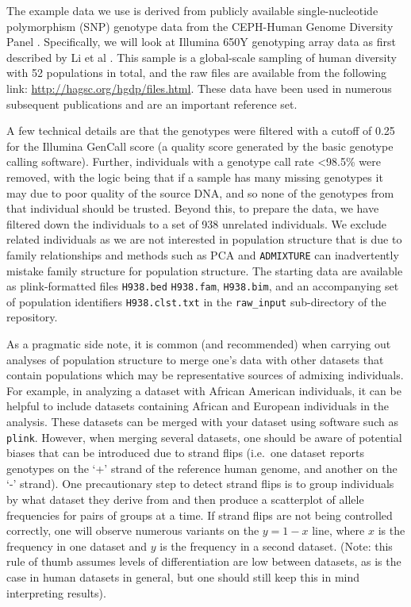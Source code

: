 \documentclass[smallextended]{svmult}       %
\begin{document}
The example data we use is derived from publicly available
single-nucleotide polymorphism (SNP) genotype data from the CEPH-Human
Genome Diversity Panel \cite{Cann02}. Specifically, we will look at
Illumina 650Y genotyping array data as first described by Li et al \cite{Li08}.
This sample is a global-scale sampling of human diversity
with 52 populations in total, and the raw files are available from the
following link: \url{http://hagsc.org/hgdp/files.html}. These data have
been used in numerous subsequent publications and are an important
reference set.

A few technical details are that the genotypes were filtered with a
cutoff of 0.25 for the Illumina GenCall score \cite{GenCall} (a quality
score generated by the basic genotype calling software). Further,
individuals with a genotype call rate \textless{}98.5\% were removed,
with the logic being that if a sample has many missing genotypes it may
due to poor quality of the source DNA, and so none of the genotypes from
that individual should be trusted. Beyond this, to prepare the data, we
have filtered down the individuals to a set of 938 unrelated
individuals. We exclude related individuals as we are not interested in
population structure that is due to family relationships and methods
such as PCA and \texttt{ADMIXTURE} can inadvertently mistake family
structure for population structure. The starting data are available as
plink-formatted files \texttt{H938.bed} \texttt{H938.fam},
\texttt{H938.bim}, and an accompanying set of population identifiers
\texttt{H938.clst.txt} in the \texttt{raw\_input} sub-directory of the
repository.

As a pragmatic side note, it is common (and recommended) when carrying
out analyses of population structure to merge one's data with other
datasets that contain populations which may be representative sources of
admixing individuals. For example, in analyzing a dataset with African
American individuals, it can be helpful to include datasets containing
African and European individuals in the analysis. These datasets can be
merged with your dataset using software such as \texttt{plink}. However,
when merging several datasets, one should be aware of potential biases
that can be introduced due to strand flips (i.e.~one dataset reports
genotypes on the `+' strand of the reference human genome, and another
on the `-' strand). One precautionary step to detect strand flips is to
group individuals by what dataset they derive from and then produce a
scatterplot of allele frequencies for pairs of groups at a time. If
strand flips are not being controlled correctly, one will observe
numerous variants on the \(y=1-x\) line, where \(x\) is the frequency in
one dataset and \(y\) is the frequency in a second dataset. (Note: this
rule of thumb assumes levels of differentiation are low between
datasets, as is the case in human datasets in general, but one should
still keep this in mind interpreting results).
\end{document}
